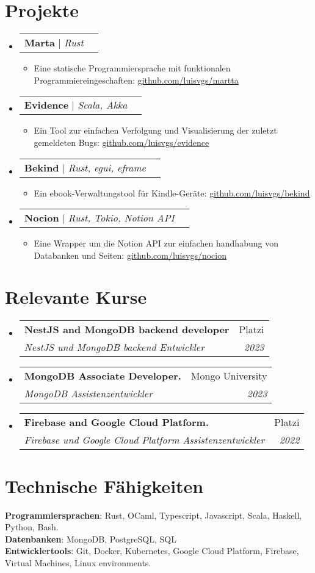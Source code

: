 \documentclass[letterpaper,11pt]{article}
\makeatletter
\newcommand{\resumeItem}[1]{
  \item\small{
    {#1 \vspace{-2pt}}
  }
}
\newcommand{\resumeSubheading}[4]{
  \vspace{-2pt}\item
    \begin{tabular*}{0.97\textwidth}[t]{l@{\extracolsep{\fill}}r}
      \textbf{#1} & #2 \\
      \textit{\small#3} & \textit{\small #4} \\
    \end{tabular*}\vspace{-7pt}
}
\newcommand{\resumeProjectHeading}[2]{
    \item
    \begin{tabular*}{0.97\textwidth}{l@{\extracolsep{\fill}}r}
      \small#1 & #2 \\
    \end{tabular*}\vspace{-7pt}
}
\newcommand{\resumeSubHeadingListStart}{\begin{itemize}[leftmargin=0.15in, label={}]}
\newcommand{\resumeSubHeadingListEnd}{\end{itemize}}
\newcommand{\resumeItemListStart}{\begin{itemize}}
\newcommand{\resumeItemListEnd}{\end{itemize}\vspace{-5pt}}
\makeatother
\begin{document}
\section{Projekte}
    \resumeSubHeadingListStart
      \resumeProjectHeading
 {\textbf{Marta} $|$ \emph{Rust}}{}
          \resumeItemListStart
            \resumeItem{Eine statische Programmiersprache mit funktionalen Programmiereingeschaften: \href{https://github.com/luisvgs/martta}{\underline{github.com/luisvgs/martta}}}
    \resumeItemListEnd
    \resumeProjectHeading
 {\textbf{Evidence} $|$ \emph{Scala, Akka}}{}
          \resumeItemListStart
            \resumeItem{Ein Tool zur einfachen Verfolgung und Visualisierung der zuletzt gemeldeten Bugs: \href{https://github.com/luisvgs/evidence}{\underline{github.com/luisvgs/evidence}}}
    \resumeItemListEnd
    \resumeProjectHeading
{\textbf{Bekind} $|$ \emph{Rust, egui, eframe}}{}
          \resumeItemListStart
            \resumeItem{Ein ebook-Verwaltungstool für Kindle-Geräte:
        \href{https://github.com/luisvgs/bekind}{\underline{github.com/luisvgs/bekind}}}
    \resumeItemListEnd
    \resumeProjectHeading
{\textbf{Nocion} $|$ \emph{Rust, Tokio, Notion API}}{}
          \resumeItemListStart
          \resumeItem{Eine Wrapper um die Notion API zur einfachen handhabung von Databanken und Seiten:     \href{https://github.com/luisvgs/nocion}{\underline{github.com/luisvgs/nocion}}}
    \resumeItemListEnd
    \resumeSubHeadingListEnd

\section{Relevante Kurse}
  \resumeSubHeadingListStart
    \resumeSubheading
      {NestJS and MongoDB backend developer}{\footnotesize Platzi}
      {\footnotesize \upshape NestJS und MongoDB backend Entwickler}{2023}
    \resumeSubheading
      {MongoDB Associate Developer.}{\footnotesize Mongo University}
      {\footnotesize \upshape MongoDB Assistenzentwickler}{2023}
    \resumeSubheading
      {Firebase and Google Cloud Platform.}{\footnotesize Platzi}
      {\footnotesize \upshape Firebase und Google Cloud Platform Assistenzentwickler}{2022}
  \resumeSubHeadingListEnd

\section{Technische Fähigkeiten}
\begin{itemize}[leftmargin=0.15in, label={}]
   \small{\item{
    \textbf{Programmiersprachen}{: Rust, OCaml, Typescript, Javascript, Scala, Haskell, Python, Bash.} \\
    \textbf{Datenbanken}{: MongoDB, PostgreSQL, SQL} \\
    \textbf{Entwicklertools}{: Git, Docker, Kubernetes, Google Cloud Platform, Firebase, Virtual Machines, Linux environments.} \\
   }}
\end{itemize}
\end{document}
